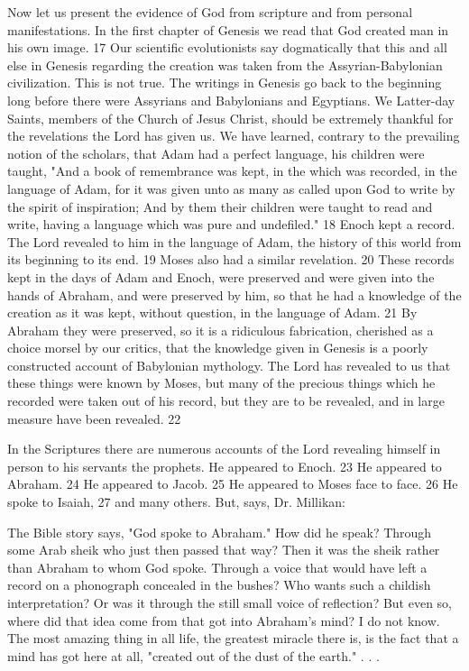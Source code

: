 Now let us present the evidence of God from scripture and from personal manifestations. In
the first chapter of Genesis we read that God created man in his own image. 17 Our scientific
evolutionists say dogmatically that this and all else in Genesis regarding the creation was
taken from the Assyrian-Babylonian civilization. This is not true. The writings in Genesis go
back to the beginning long before there were Assyrians and Babylonians and Egyptians. We
Latter-day Saints, members of the Church of Jesus Christ, should be extremely thankful for
the revelations the Lord has given us. We have learned, contrary to the prevailing notion of
the scholars, that Adam had a perfect language, his children were taught, "And a book of
remembrance was kept, in the which was recorded, in the language of Adam, for it was given
unto as many as called upon God to write by the spirit of inspiration; And by them their
children were taught to read and write, having a language which was pure and undefiled." 18
Enoch kept a record. The Lord revealed to him in the language of Adam, the history of this
world from its beginning to its end. 19 Moses also had a similar revelation. 20 These records
kept in the days of Adam and Enoch, were preserved and were given into the hands of
Abraham, and were preserved by him, so that he had a knowledge of the creation as it was
kept, without question, in the language of Adam. 21 By Abraham they were preserved, so it
is a ridiculous fabrication, cherished as a choice morsel by our critics, that the knowledge
given in Genesis is a poorly constructed account of Babylonian mythology. The Lord has
revealed to us that these things were known by Moses, but many of the precious things which
he recorded were taken out of his record, but they are to be revealed, and in large measure
have been revealed. 22

In the Scriptures there are numerous accounts of the Lord revealing himself in person to his
servants the prophets. He appeared to Enoch. 23 He appeared to Abraham. 24 He appeared to
Jacob. 25 He appeared to Moses face to face. 26 He spoke to Isaiah, 27 and many others.
But, says, Dr. Millikan:

The Bible story says, "God spoke to Abraham." How did he speak? Through some Arab
sheik who just then passed that way? Then it was the sheik rather than Abraham to whom
God spoke. Through a voice that would have left a record on a phonograph concealed in the
bushes? Who wants such a childish interpretation? Or was it through the still small voice of
reflection? But even so, where did that idea come from that got into Abraham's mind? I do
not know. The most amazing thing in all life, the greatest miracle there is, is the fact that a
mind has got here at all, "created out of the dust of the earth." . . .

